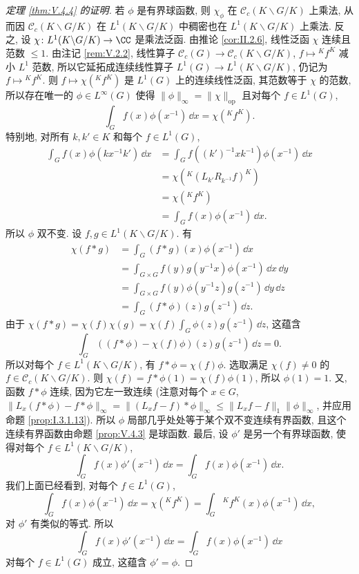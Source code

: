 \begin{proof}[定理 \ref{thm:V.4.4} 的证明]
若 $\phi$ 是有界球函数, 则 $\chi_{\phi}$ 在 $\mathcal{C}_c(K\backslash G/K)$ 上乘法, 从而因 $\mathcal{C}_c(K\backslash G/K)$ 在 $L^1(K\backslash G/K)$ 中稠密也在 $L^1(K\backslash G/K)$ 上乘法.
反之, 设 $\chi \colon L^1(K\backslash G/K) \to \CC$ 是乘法泛函. 由推论 \ref{cor:II.2.6}, 线性泛函 $\chi$ 连续且范数 $\leq 1$.
由注记 \ref{rem:V.2.2}, 线性算子 $\mathcal{C}_c(G) \to \mathcal{C}_c(K\backslash G/K)$, $f \longmapsto {}^Kf^K$ 减小 $L^1$ 范数, 所以它延拓成连续线性算子 $L^1(G) \to L^1(K\backslash G/K)$, 仍记为 $f \longmapsto {}^Kf^K$. 则 $f \longmapsto \chi({}^Kf^K)$ 是 $L^1(G)$ 上的连续线性泛函, 其范数等于 $\chi$ 的范数, 所以存在唯一的 $\phi \in L^{\infty}(G)$ 使得 $\|\phi\|_{\infty} = \|\chi\|_{\mathrm{op}}$ 且对每个 $f \in L^1(G)$,
\[
\int_G f(x)\phi(x^{-1})\,\dd x = \chi({}^Kf^K).
\]
特别地, 对所有 $k, k' \in K$ 和每个 $f \in L^1(G)$,
\begin{align*}
\int_G f(x)\phi(kx^{-1}k')\,\dd x &= \int_G f((k')^{-1}xk^{-1})\phi(x^{-1})\,\dd x \\
&= \chi({}^K(L_{k'}R_{k^{-1}}f)^K) \\
&= \chi({}^Kf^K) \\
&= \int_G f(x)\phi(x^{-1})\,\dd x.
\end{align*}
所以 $\phi$ 双不变.
设 $f, g \in L^1(K\backslash G/K)$. 有
\begin{align*}
\chi(f * g) &= \int_G (f * g)(x)\phi(x^{-1})\,\dd x \\
&= \int_{G \times G}f(y)g(y^{-1}x)\phi(x^{-1})\,\dd x\,\dd y \\
&= \int_{G \times G}f(y)\phi(y^{-1}z)g(z^{-1})\,\dd y\,\dd z \\
&= \int_G (f * \phi)(z)g(z^{-1})\,\dd z.
\end{align*}
由于 $\chi(f * g) = \chi(f)\chi(g) = \chi(f)\int_G \phi(z)g(z^{-1})\,\dd z$, 这蕴含
\[
\int_G ((f * \phi) - \chi(f)\phi)(z)g(z^{-1})\,\dd z = 0.
\]
所以对每个 $f \in L^1(K\backslash G/K)$, 有 $f * \phi = \chi(f)\phi$. 选取满足 $\chi(f) \neq 0$ 的 $f \in \mathcal{C}_c(K\backslash G/K)$. 则 $\chi(f) = f * \phi(1) = \chi(f)\phi(1)$, 所以 $\phi(1) = 1$. 又, 函数 $f * \phi$ 连续, 因为它左一致连续 (注意对每个 $x \in G$, $\|L_x(f * \phi) - f * \phi\|_{\infty} = \|(L_xf - f) * \phi\|_{\infty} \leq \|L_xf - f\|_1\|\phi\|_{\infty}$, 并应用命题 \ref{prop:I.3.1.13}). 所以 $\phi$ 局部几乎处处等于某个双不变连续有界函数, 且这个连续有界函数由命题 \ref{prop:V.4.3} 是球函数.
最后, 设 $\phi'$ 是另一个有界球函数, 使得对每个 $f \in L^1(K\backslash G/K)$,
\[
\int_G f(x)\phi'(x^{-1})\,\dd x = \int_G f(x)\phi(x^{-1})\,\dd x.
\]
我们上面已经看到, 对每个 $f \in L^1(G)$,
\[
\int_G f(x)\phi(x^{-1})\,\dd x = \chi({}^Kf^K) = \int_G {}^Kf^K(x)\phi(x^{-1})\,\dd x,
\]
对 $\phi'$ 有类似的等式. 所以
\[
\int_G f(x)\phi'(x^{-1})\,\dd x = \int_G f(x)\phi(x^{-1})\,\dd x
\]
对每个 $f \in L^1(G)$ 成立, 这蕴含 $\phi' = \phi$.
\end{proof}


